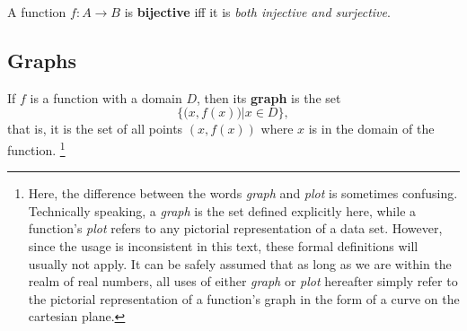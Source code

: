   \begin{defn}
    A function $f:A \to B$ is \textbf{bijective} iff it is \emph{both injective and surjective}.
  \end{defn}
\begin{figure}[H]
    \begin{center}
        \hspace{0.2in}%
    \end{center}
  \end{figure}


\subsection{Graphs} 

\begin{defn}
    If $f$ is a function with a domain $D$, then its \textbf{graph} is the set
    \[ \Big\{ \big( x,f(x) \big) \Big | x \in D \Big\},\]
    that is, it is the set of all points $(x, f(x))$ where $x$ is in the domain of the function.%
\footnote{Here, the difference between the words \emph{graph} and \emph{plot} is sometimes confusing. Technically speaking, a \emph{graph} is the set defined explicitly here, while a function's \emph{plot} refers to any pictorial representation of a data set. However, since the usage is inconsistent in this text, these formal definitions will usually not apply. It can be safely assumed that as long as we are within the realm of real numbers, all uses of either \emph{graph} or \emph{plot} hereafter simply refer to the pictorial representation of a function's graph in the form of a curve on the cartesian plane.}
\end{defn}

